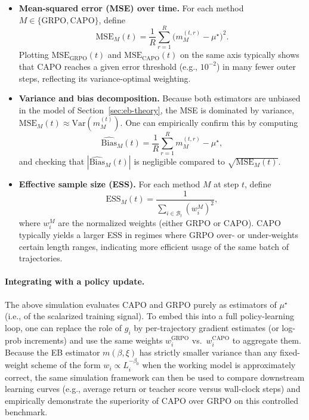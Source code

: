 \begin{itemize}
  \item \textbf{Mean-squared error (MSE) over time.}
  For each method \(M\in\{\mathrm{GRPO},\mathrm{CAPO}\}\), define
  \[
  \mathrm{MSE}_M(t)
  =\frac{1}{R}\sum_{r=1}^R \big(m_M^{(t,r)}-\mu^\star\big)^2.
  \]
  Plotting \(\mathrm{MSE}_{\mathrm{GRPO}}(t)\) and \(\mathrm{MSE}_{\mathrm{CAPO}}(t)\) on the same axis typically shows that CAPO reaches a given error threshold (e.g., \(10^{-2}\)) in many fewer outer steps, reflecting its variance-optimal weighting.

  \item \textbf{Variance and bias decomposition.}
  Because both estimators are unbiased in the model of Section~\ref{sec:eb-theory}, the MSE is dominated by variance,
  \(\mathrm{MSE}_M(t)\approx \mathrm{Var}(m_M^{(t)})\).
  One can empirically confirm this by computing
  \[
  \widehat{\mathrm{Bias}}_M(t)
  =\frac{1}{R}\sum_{r=1}^R m_M^{(t,r)}-\mu^\star,
  \]
  and checking that \(|\widehat{\mathrm{Bias}}_M(t)|\) is negligible compared to \(\sqrt{\mathrm{MSE}_M(t)}\).

  \item \textbf{Effective sample size (ESS).}
  For each method \(M\) at step \(t\), define
  \[
  \mathrm{ESS}_M(t)
  =\frac{1}{\sum_{i\in\mathcal B_t} (w_i^M)^2},
  \]
  where \(w_i^M\) are the normalized weights (either GRPO or CAPO).
  CAPO typically yields a larger ESS in regimes where GRPO over- or under-weights certain length ranges, indicating more efficient usage of the same batch of trajectories.
\end{itemize}

\paragraph{Integrating with a policy update.}
The above simulation evaluates CAPO and GRPO purely as estimators of \(\mu^\star\) (i.e., of the scalarized training signal).
To embed this into a full policy-learning loop, one can replace the role of \(g_i\) by per-trajectory gradient estimates (or log-prob increments) and use the same weights \(w_i^{\mathrm{GRPO}}\) vs.\ \(w_i^{\mathrm{CAPO}}\) to aggregate them.
Because the EB estimator \(m(\beta,\xi)\) has strictly smaller variance than any fixed-weight scheme of the form \(w_i\propto L_i^{-\beta_0}\) when the working model is approximately correct, the same simulation framework can then be used to compare downstream learning curves (e.g., average return or teacher score versus wall-clock steps) and empirically demonstrate the superiority of CAPO over GRPO on this controlled benchmark.


